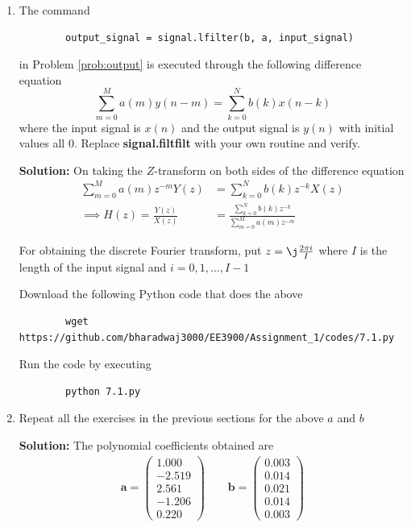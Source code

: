 \documentclass[journal,12pt,twocolumn]{IEEEtran}
\newcommand{\solution}{\noindent \textbf{Solution: }}
\providecommand{\brak}[1]{\ensuremath{\left(#1\right)}}
\let\vec\mathbf
\numberwithin{equation}{section}
\renewcommand\thesection{\arabic{section}}
\newcommand{\myvec}[1]{\ensuremath{\begin{pmatrix}#1\end{pmatrix}}}
\begin{document}
	\begin{enumerate}[label=\thesection.\arabic*]
	\item The command
	\begin{lstlisting}
		output_signal = signal.lfilter(b, a, input_signal)
	\end{lstlisting}
	in Problem \ref{prob:output} is executed through the following difference equation
	\begin{equation}
		\label{eq:iir_filter_gen}
 		\sum _{m=0}^{M}a\brak{m}y\brak{n-m}=\sum _{k=0}^{N}b\brak{k}x\brak{n-k}
	\end{equation}
	where the input signal is $x(n)$ and the output signal is $y(n)$ with initial values all 0. Replace \textbf{signal.filtfilt} with your own routine and verify.
	
	\solution On taking the $Z$-transform on both sides of the difference equation
	\begin{align}
		\sum _{m=0}^{M}a\brak{m} z^{-m} Y(z) &= \sum _{k=0}^{N}b\brak{k} z^{-k} X(z) \\
		\implies H(z) = \frac{Y(z)}{X(z)} &= \frac{\sum _{k=0}^{N}b\brak{k} z^{-k}}{\sum _{m=0}^{M}a\brak{m} z^{-m}}
	\end{align}
	
	For obtaining the discrete Fourier transform, put $z = \j \frac{2\pi i}{I}$ where $I$ is the length of the input signal and $i = 0, 1, \ldots, I-1$
	
	Download the following Python code that does the above
	\begin{lstlisting}
		wget https://github.com/bharadwaj3000/EE3900/Assignment_1/codes/7.1.py
	\end{lstlisting}
	
	Run the code by executing
	\begin{lstlisting}
		python 7.1.py
	\end{lstlisting}
	
	\item Repeat all the exercises in the previous sections for the above $a$ and $b$
	
	\solution The polynomial coefficients obtained are
	\begin{align}
		\vec{a} = \myvec{1.000 \\ -2.519 \\ 2.561 \\ -1.206 \\ 0.220} \qquad
		\vec{b} = \myvec{0.003 \\ 0.014 \\ 0.021 \\ 0.014 \\ 0.003}
	\end{align}
	

\end{enumerate}
\end{document}
